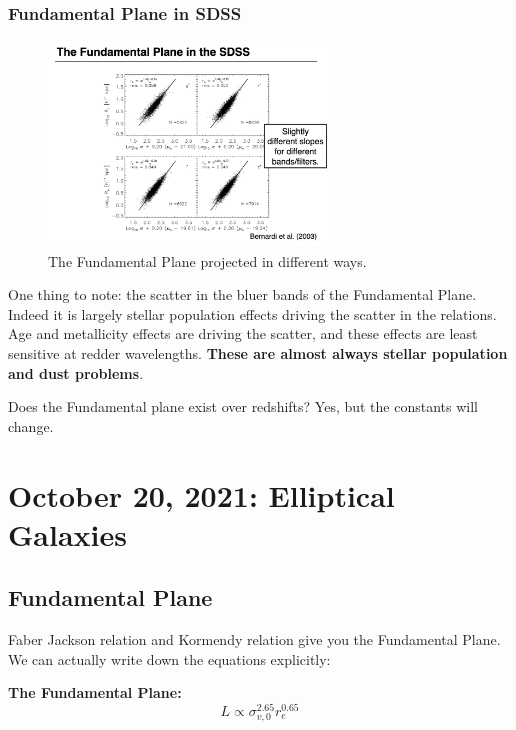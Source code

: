 \documentclass{article}
\begin{document}
\subsubsection{Fundamental Plane in SDSS}

\begin{figure}
    \centering
\includegraphics[width=0.66\textwidth]{figs/Screen Shot 2021-10-15 at 10.35.34 AM.png}
    \caption{The Fundamental Plane projected in different ways.}
    \label{fig:fundamental_plane_many_projections}
\end{figure}

One thing to note: the scatter in the bluer bands of the Fundamental Plane. Indeed it is largely stellar population effects driving the scatter in the relations. Age and metallicity effects are driving the scatter, and these effects are least sensitive at redder wavelengths. \textbf{These are almost always stellar population and dust problems}.

Does the Fundamental plane exist over redshifts? Yes, but the constants will change. 

\section{October 20, 2021: Elliptical Galaxies}

\subsection{Fundamental Plane}

Faber Jackson relation and Kormendy relation give you the Fundamental Plane. We can actually write down the equations explicitly:


\textbf{The Fundamental Plane:}
\begin{equation}
    \boxed{L \propto \sigma_{v,0}^{2.65} r_e^{0.65}}
\end{equation}
\end{document}

